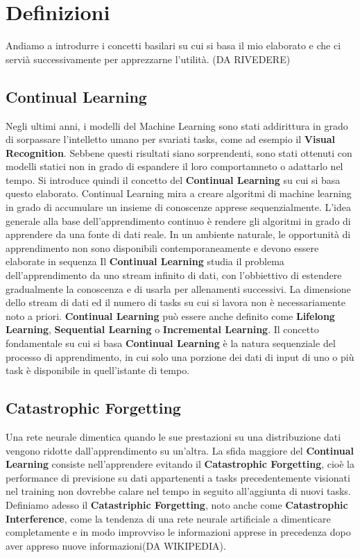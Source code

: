 \chapter{Definizioni}\label{ch:chapter1}
Andiamo a introdurre i concetti basilari su cui si basa il mio elaborato e che ci servià successivamente per apprezzarne l'utilità. (DA RIVEDERE)
\section{Continual Learning}
Negli ultimi anni, i modelli del Machine Learning sono stati addirittura in grado di sorpassare l'intelletto umano per svariati tasks, come ad esempio il \textbf{Visual Recognition}.
Sebbene questi risultati siano sorprendenti, sono stati ottenuti con modelli statici non in grado di espandere il loro comportamneto o adattarlo nel tempo. Si introduce quindi il concetto del \textbf{Continual Learning} su cui si basa questo elaborato.\newline
Continual Learning mira a creare algoritmi di machine learning in grado di accumulare un insieme di conoscenze apprese sequenzialmente. L'idea generale alla base dell'apprendimento continuo è rendere gli algoritmi in grado di apprendere da una fonte di dati reale. In un ambiente naturale, le opportunità di apprendimento non sono disponibili contemporaneamente e devono essere elaborate in sequenza
Il \textbf{Continual Learning} studia il problema dell'apprendimento da uno stream infinito di dati, con l'obbiettivo di estendere gradualmente la conoscenza e di usarla per allenamenti successivi. La dimensione dello stream di dati ed il numero di tasks su cui si lavora non è necessariamente noto a priori. \textbf{Continual Learning} può essere anche definito come \textbf{Lifelong Learning}, \textbf{Sequential Learning} o \textbf{Incremental Learning}.
Il concetto fondamentale su cui si basa \textbf{Continual Learning} è la natura sequenziale del processo di apprendimento, in cui solo una porzione dei dati di input di uno o più task è disponibile in quell'istante di tempo.
\section{Catastrophic Forgetting}
Una rete neurale dimentica quando le sue prestazioni su una distribuzione dati vengono ridotte dall'apprendimento su un'altra.
La sfida maggiore del \textbf{Continual Learning} consiste nell'apprendere evitando il  \textbf{Catastrophic Forgetting}, cioè la performance di previsione su dati appartenenti a tasks precedentemente visionati nel training non dovrebbe calare nel tempo in seguito all'aggiunta di nuovi tasks.
Definiamo adesso il \textbf{Catastriphic Forgetting}, noto anche come \textbf{Catastrophic Interference}, come la tendenza di una rete neurale artificiale a dimenticare completamente e in modo improvviso le informazioni apprese in precedenza dopo aver appreso nuove informazioni(DA WIKIPEDIA).
